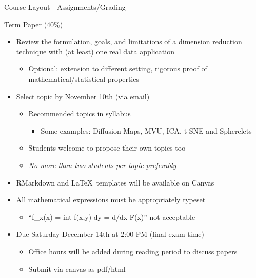 \documentclass{beamer}
\begin{document}
\begin{frame}{Course Layout - Assignments/Grading}
\begin{block}{Term Paper (40\%)}
\begin{itemize}
\item Review the  formulation, goals, and limitations of a dimension reduction technique with (at least) one real data application
	\begin{itemize}
		\item Optional: extension to different setting, rigorous proof of mathematical/statistical properties 
	\end{itemize}
\item Select topic by November 10th (via email)
	\begin{itemize}
		\item Recommended topics in syllabus
			\begin{itemize}
				\item Some examples: Diffusion Maps, MVU, ICA, t-SNE and Spherelets
			\end{itemize}
		\item Students welcome to propose their own topics too
		\item \emph{No more than two students per topic preferably} 
	\end{itemize}
\item RMarkdown and \LaTeX\, templates will be available on Canvas
	\item All mathematical expressions must be appropriately typeset
		\begin{itemize}
			\item ``f\_x(x) = int f(x,y) dy = d/dx F(x)'' not acceptable
		\end{itemize}

\item Due Saturday December 14th at 2:00 PM (final exam time)
	\begin{itemize}
		\item Office hours will be added during reading period to discuss papers
		\item Submit via canvas as pdf/html
	\end{itemize}
\end{itemize}
\end{block}
\end{frame}
\end{document}
